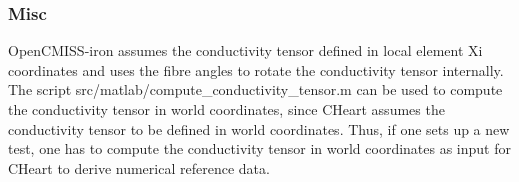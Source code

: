 \subsubsection{Misc}
%
OpenCMISS-iron assumes the conductivity tensor defined in local element
Xi coordinates and uses the fibre angles to rotate the conductivity tensor
internally.
The script src/matlab/compute\_conductivity\_tensor.m can be used to compute the
conductivity tensor in world coordinates, since CHeart assumes the conductivity
tensor to be defined in world coordinates.
Thus, if one sets up a new test, one has to compute the conductivity tensor
in world coordinates as input for CHeart to derive numerical reference data.
%
